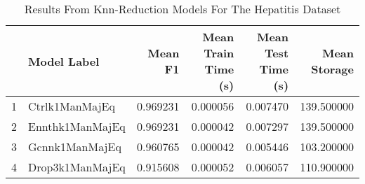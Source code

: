 \begin{table}[!htbp]
\centering
\caption{Results From Knn-Reduction Models For The Hepatitis Dataset}
\label{tab:knn_reduction_results_hepatitis}
\begin{tabular}{rlrrrr}
\toprule
 & Model Label & Mean F1 & Mean Train Time (s) & Mean Test Time (s) & Mean Storage \\
\midrule
1 & Ctrlk1ManMajEq & 0.969231 & 0.000056 & 0.007470 & 139.500000 \\
2 & Ennthk1ManMajEq & 0.969231 & 0.000042 & 0.007297 & 139.500000 \\
3 & Gcnnk1ManMajEq & 0.960765 & 0.000042 & 0.005446 & 103.200000 \\
4 & Drop3k1ManMajEq & 0.915608 & 0.000052 & 0.006057 & 110.900000 \\
\bottomrule
\end{tabular}
\end{table}
